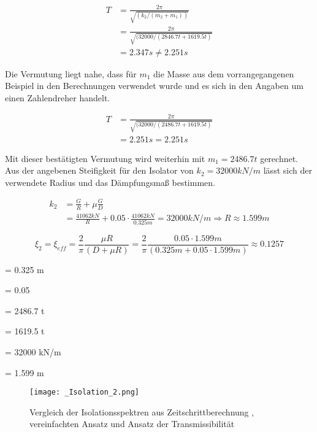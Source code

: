 \begin{align*}
T &= \frac{2 \pi}{\sqrt{(k_2/(m_2+m_1))}}\\
  &= \frac{2 \pi}{\sqrt{(32000/( 2846.7 t + 1619.5 t)}}\\
  &= 2.347 s \neq 2.251 s
\end{align*}

Die Vermutung liegt nahe, dass für $m_1$ die Masse aus dem vorrangegangenen Beispiel in den Berechnungen verwendet wurde und es sich in den Angaben um einen \glqq Zahlendreher\grqq{} handelt.

\begin{align*}
T &= \frac{2 \pi}{\sqrt{(32000/( 2486.7 t + 1619.5 t)}}\\
  &= 2.251 s = 2.251 s
\end{align*}

Mit dieser bestätigten Vermutung wird weiterhin mit $m_1 = 2486.7 t$ gerechnet.
Aus der angebenen Steifigkeit für den Isolator von $k_2 = 32000 kN/m$ lässt sich der verwendete Radius und das Dämpfungsmaß bestimmen.

\begin{align*}
k_2 &= \frac{G}{R} + \mu \frac{G}{D}\\
    &= \frac{41062 kN}{R} + 0.05 \cdot \frac{41062 kN}{0.325 m} = 32000 kN/m \Rightarrow R \approx 1.599 m
\end{align*}

\begin{equation*}
\xi_2 = \xi_{eff} = \frac{2}{\pi} \frac{\mu R}{(D + \mu R)} = \frac{2}{\pi} \frac{0.05 \cdot 1.599 m}{(0.325 m + 0.05 \cdot 1.599 m)} \approx 0.1257
\end{equation*} 

    = 0.325 m \par
\makebox[1cm]{$\mu$}  = 0.05\par
{}  = 2486.7 t\par
{}  = 1619.5 t\par
{}  = 32000 kN/m \par
{}    = 1.599 m\par

\begin{figure}[H]
    \centering
    \texttt{[image: \_Isolation\_2.png]}
    \caption{Vergleich der Isolationsspektren aus Zeitschrittberechnung \cite{Isemann}, vereinfachten Ansatz und Ansatz der Transmissibilität}
    \label{fig:Isolation}
\end{figure}

